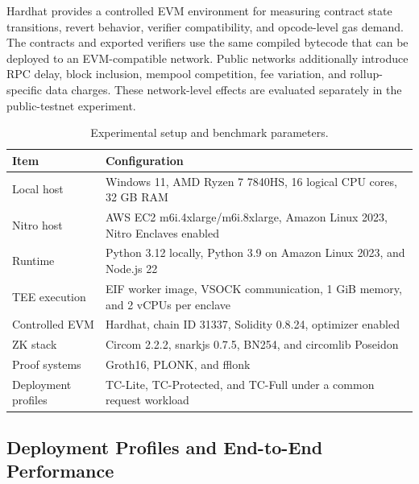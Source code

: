 \documentclass[10pt,journal,compsoc]{IEEEtran}
\begin{document}
Hardhat provides a controlled EVM environment for measuring contract state transitions, revert behavior, verifier compatibility, and opcode-level gas demand. The contracts and exported verifiers use the same compiled bytecode that can be deployed to an EVM-compatible network. Public networks additionally introduce RPC delay, block inclusion, mempool competition, fee variation, and rollup-specific data charges. These network-level effects are evaluated separately in the public-testnet experiment.

\begin{table}[!t]
\centering
\caption{Experimental setup and benchmark parameters.}
\label{tab:experiment_setup}
\begin{tabular}{@{}
>{\raggedright\arraybackslash}m{}
>{\raggedright\arraybackslash}m{}@{}}
\toprule
\textbf{Item} & \textbf{Configuration} \\
\midrule

Local host &
Windows 11, AMD Ryzen 7 7840HS, 16 logical CPU cores,
32 GB RAM \\

Nitro host &
AWS EC2 m6i.4xlarge/m6i.8xlarge, Amazon Linux 2023,
Nitro Enclaves enabled \\

Runtime &
Python 3.12 locally, Python 3.9 on Amazon Linux 2023,
and Node.js 22 \\

TEE execution &
EIF worker image, VSOCK communication,
1 GiB memory, and 2 vCPUs per enclave \\

Controlled EVM &
Hardhat, chain ID 31337, Solidity 0.8.24,
optimizer enabled \\

ZK stack &
Circom 2.2.2, snarkjs 0.7.5, BN254,
and circomlib Poseidon \\

Proof systems &
Groth16, PLONK, and fflonk \\

Deployment profiles & TC-Lite, TC-Protected, and TC-Full under a common request workload \\

\bottomrule
\end{tabular}
\end{table}


\subsection{Deployment Profiles and End-to-End Performance}
\label{subsec:e2e_performance}
\end{document}
